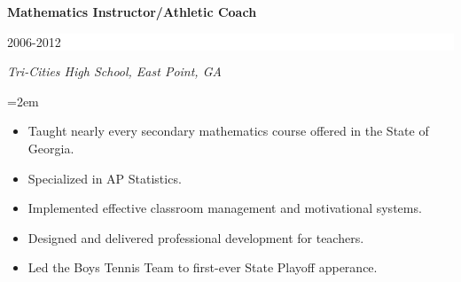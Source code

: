 \documentclass[paper=a4,fontsize=11pt]{scrartcl} %
\newcommand{\EducationEntry}[4]{
		\noindent \textbf{#1} \hfill      %
		\colorbox{White}{%
			\parbox{6em}{%
			\hfill\color{Black}#2}} \par  %
		\noindent \textit{#3} \par        %
		\noindent\hangindent=2em\hangafter=0 \small #4 %
		\normalsize \par \vspace{-7pt}}
\begin{document}
\EducationEntry{Mathematics Instructor/Athletic Coach}{2006-2012}{Tri-Cities High School, East Point, GA}{
  \begin{itemize}
  \item Taught nearly every secondary mathematics course offered in the State of Georgia.
  \item Specialized in AP Statistics.
  \item Implemented effective classroom management and motivational systems.
  \item Designed and delivered professional development for teachers.
   \item Led the Boys Tennis Team to first-ever State Playoff apperance.
\end{itemize}}

\end{document}
